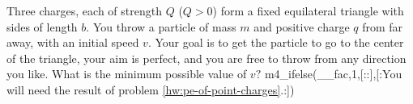 Three charges, each of strength $Q$ ($Q>0$) form a fixed
equilateral triangle with sides of length $b$. You throw a
particle of mass $m$ and positive charge $q$ from far away,
with an initial speed $v$. Your goal is to get the particle
to go to the center of the triangle, your aim is perfect,
and you are free to throw from any direction you like. What
is the minimum possible value of $v?$
m4_ifelse(__fac,1,[::],[:You will need the result of problem \ref{hw:pe-of-point-charges}.:])
\answercheck
